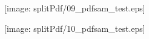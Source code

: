 \documentclass[portrait,a0c,final]{a0poster}
\newenvironment{poster}{
  \begin{center}
  \begin{minipage}[c]{0.99\textwidth}
}{
  \end{minipage} 
  \end{center}
}
\newenvironment{pcolumn}[1]{
  \begin{minipage}{#1\textwidth}
  \begin{center}
}{
  \end{center}
  \end{minipage}
}
\newcommand{\pbox}[4]{
\psshadowbox[#3]{
\begin{minipage}[t][#2][t]{#1}
#4
\end{minipage}
}}
\begin{document}
\begin{poster}
\begin{multicols}{2}
\begin{pcolumn}{0.5}
\texttt{[image: splitPdf/09\_pdfsam\_test.eps]}
\end{pcolumn}
  \begin{pcolumn}{0.5}
 
\texttt{[image: splitPdf/10\_pdfsam\_test.eps]}
\end{pcolumn}
 \end{multicols}

\end{poster}
\end{document}

